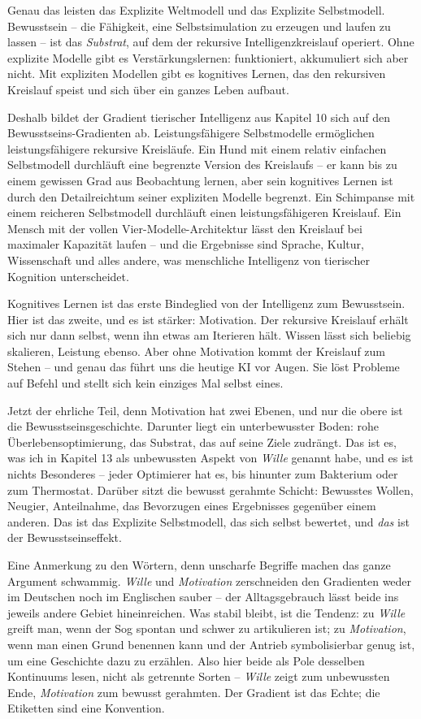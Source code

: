 \documentclass[11pt, twoside, openright]{book}
\begin{document}
Genau das leisten das Explizite Weltmodell und das Explizite Selbstmodell. Bewusstsein -- die Fähigkeit, eine Selbstsimulation zu erzeugen und laufen zu lassen -- ist das \textit{Substrat}, auf dem der rekursive Intelligenzkreislauf operiert. Ohne explizite Modelle gibt es Verstärkungslernen: funktioniert, akkumuliert sich aber nicht. Mit expliziten Modellen gibt es kognitives Lernen, das den rekursiven Kreislauf speist und sich über ein ganzes Leben aufbaut.

Deshalb bildet der Gradient tierischer Intelligenz aus Kapitel 10 sich auf den Bewusstseins-Gradienten ab. Leistungsfähigere Selbstmodelle ermöglichen leistungsfähigere rekursive Kreisläufe. Ein Hund mit einem relativ einfachen Selbstmodell durchläuft eine begrenzte Version des Kreislaufs -- er kann bis zu einem gewissen Grad aus Beobachtung lernen, aber sein kognitives Lernen ist durch den Detailreichtum seiner expliziten Modelle begrenzt. Ein Schimpanse mit einem reicheren Selbstmodell durchläuft einen leistungsfähigeren Kreislauf. Ein Mensch mit der vollen Vier-Modelle-Architektur lässt den Kreislauf bei maximaler Kapazität laufen -- und die Ergebnisse sind Sprache, Kultur, Wissenschaft und alles andere, was menschliche Intelligenz von tierischer Kognition unterscheidet.

Kognitives Lernen ist das erste Bindeglied von der Intelligenz zum Bewusstsein. Hier ist das zweite, und es ist stärker: Motivation. Der rekursive Kreislauf erhält sich nur dann selbst, wenn ihn etwas am Iterieren hält. Wissen lässt sich beliebig skalieren, Leistung ebenso. Aber ohne Motivation kommt der Kreislauf zum Stehen -- und genau das führt uns die heutige KI vor Augen. Sie löst Probleme auf Befehl und stellt sich kein einziges Mal selbst eines.

Jetzt der ehrliche Teil, denn Motivation hat zwei Ebenen, und nur die obere ist die Bewusstseinsgeschichte. Darunter liegt ein unterbewusster Boden: rohe Überlebensoptimierung, das Substrat, das auf seine Ziele zudrängt. Das ist es, was ich in Kapitel 13 als unbewussten Aspekt von \textit{Wille} genannt habe, und es ist nichts Besonderes -- jeder Optimierer hat es, bis hinunter zum Bakterium oder zum Thermostat. Darüber sitzt die bewusst gerahmte Schicht: Bewusstes Wollen, Neugier, Anteilnahme, das Bevorzugen eines Ergebnisses gegenüber einem anderen. Das ist das Explizite Selbstmodell, das sich selbst bewertet, und \textit{das} ist der Bewusstseinseffekt.

Eine Anmerkung zu den Wörtern, denn unscharfe Begriffe machen das ganze Argument schwammig. \textit{Wille} und \textit{Motivation} zerschneiden den Gradienten weder im Deutschen noch im Englischen sauber -- der Alltagsgebrauch lässt beide ins jeweils andere Gebiet hineinreichen. Was stabil bleibt, ist die Tendenz: zu \textit{Wille} greift man, wenn der Sog spontan und schwer zu artikulieren ist; zu \textit{Motivation}, wenn man einen Grund benennen kann und der Antrieb symbolisierbar genug ist, um eine Geschichte dazu zu erzählen. Also hier beide als Pole desselben Kontinuums lesen, nicht als getrennte Sorten -- \textit{Wille} zeigt zum unbewussten Ende, \textit{Motivation} zum bewusst gerahmten. Der Gradient ist das Echte; die Etiketten sind eine Konvention.
\end{document}
